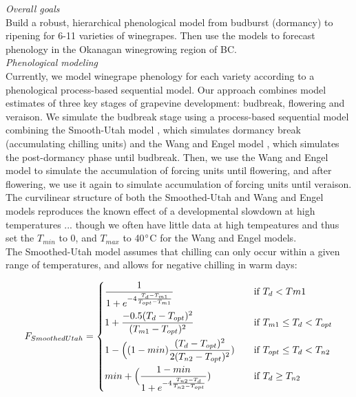 \documentclass[11pt,letter]{article}
\begin{document}

\renewcommand{\refname}{\CHead{}}


\emph{Overall goals}\\
Build a robust, hierarchical phenological model from budburst (dormancy) to ripening for 6-11 varieties of winegrapes. Then use the models to forecast phenology in the Okanagan winegrowing region of BC. \\

\emph{Phenological modeling}\\
Currently, we model winegrape phenology for each variety according to a phenological process-based sequential model. Our approach combines model estimates of three key stages of grapevine development: budbreak, flowering and veraison. We simulate the budbreak stage using a process-based sequential model combining the Smooth-Utah model \citep{richardson1974model,bonhomme2010}, which simulates dormancy break  (accumulating chilling units) and the Wang and Engel model \citep{wang1998simulation}, which simulates the post-dormancy phase until budbreak. Then, we use the Wang and Engel model to simulate the accumulation of forcing units until flowering, and after flowering, we use it again to simulate accumulation of forcing units until veraison. \\

The curvilinear structure of both the Smoothed-Utah and Wang and Engel models reproduces the known effect of a developmental slowdown at high temperatures \citep{garcia2010curvilinear}... though we often have little data at high tempeatures and thus set the $T_{min}$ to 0, and $T_{max}$ to 40$\degree$C for the Wang and Engel models.\\ 

The Smoothed-Utah model \citep{richardson1974model,bonhomme2010} assumes that chilling can only occur within a given range of temperatures, and allows for negative chilling in warm days: %

\begin{equation}
F_{SmoothedUtah}  =
\begin{dcases}
\frac{1}{1+e^{-4\frac{T_d-T_{m1}}{T_{opt}-T_{m1}}}}      & \quad \text{if } T_d<T{m1} \\
1+\frac{-0.5(T_d-T_{opt})^2}{(T_{m1}-T_{opt})^2}		& \quad \text{if } T_{m1} \leq T_d < T_{opt}\\
1-\Big((1-min)\frac{(T_d-T_{opt})^2}{2(T_{n2}-T_{opt})^2})   & \quad \text{if } T_{opt} \leq T_d < T_{n2}\\
min+\Big(\frac{1-min}{1+e^{-4\frac{T_{n2}-T_d}{T_{n2}-T_{opt}}}})  & \quad \text{if } T_d \geq T_{n2}
\end{dcases}
\end{equation}
\end{document}
